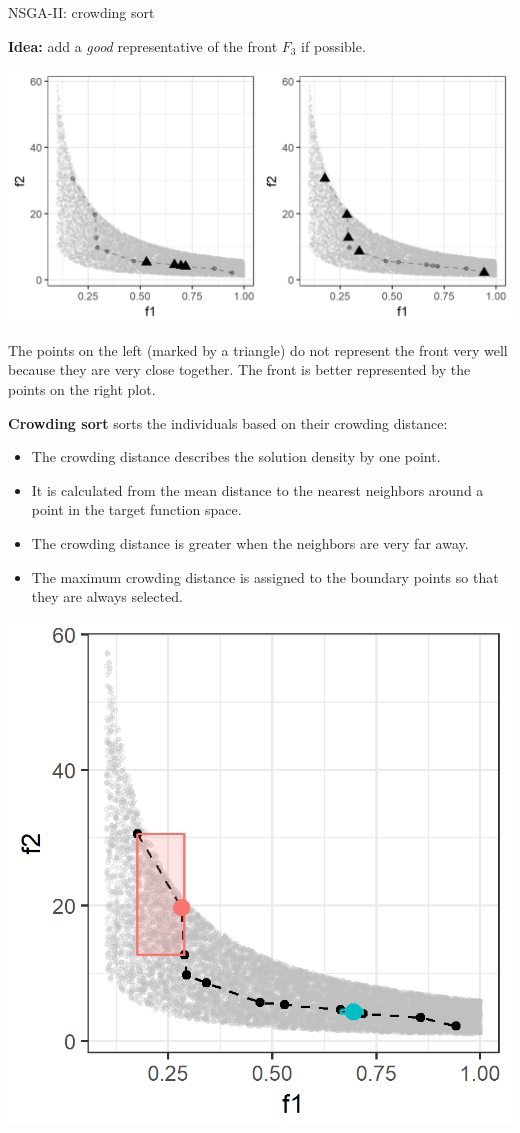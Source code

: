\begin{frame}[allowframebreaks]{NSGA-II: crowding sort}

\textbf{Idea:} add a \textit{good} representative of the front $F_3$ if possible.

\begin{center}
\includegraphics[height = 0.5\textheight]{images/NSGA2_CS1.png}
\end{center}

The points on the left (marked by a triangle) do not represent the front very well because they are very close together. The front is better represented by the points on the right plot.

\framebreak

\textbf{Crowding sort} sorts the individuals based on their crowding distance:

\begin{itemize}
\item The crowding distance describes the solution density by one point.
\item It is calculated from the mean distance to the nearest neighbors around a point in the target function space.
\item The crowding distance is greater when the neighbors are very far away.
\item The maximum crowding distance is assigned to the boundary points so that they are always selected.
\end{itemize}

\begin{center}
\includegraphics[width = 0.4\linewidth]{images/NSGA2_CS2.png}
\end{center}


\end{frame}

